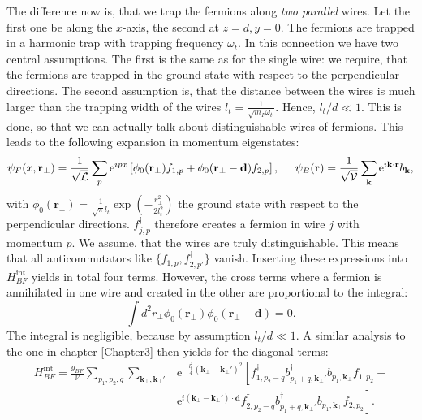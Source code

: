 The difference now is, that we trap the fermions along \textit{two parallel} wires. Let the first one be along the $x$-axis, the second at $z=d, y=0$. The fermions are trapped in a harmonic trap with trapping frequency $\omega_t$. In this connection we have two central assumptions. The first is the same as for the single wire: we require, that the fermions are trapped in the ground state with respect to the perpendicular directions. The second assumption is, that the distance between the wires is much larger than the trapping width of the wires $l_t = \frac{1}{\sqrt{m_F\omega_t}}$. Hence, $l_t/d \ll 1$. This is done, so that we can actually talk about distinguishable wires of fermions. This leads to the following expansion in momentum eigenstates:
\begin{equation}
\psi_F(x,\mathbf{r}_\perp) = \frac{1}{\sqrt{\mathcal{L}}}\sum_p \text{e}^{ipx} \left[\phi_0(\mathbf{r}_\perp) f_{1,p} + \phi_0(\mathbf{r}_\perp-\mathbf{d}) f_{2,p}\right], \hspace{0.5cm} \psi_B(\mathbf{r}) = \frac{1}{\sqrt{\mathcal{V}}}\sum_{\mathbf{k}} \text{e}^{i\mathbf{k}\cdot \mathbf{r}} b_\mathbf{k}, 
\end{equation}  
with $\phi_0(\mathbf{r}_\perp) = \frac{1}{\sqrt{\pi}l_t}\exp\left(-\frac{r_\perp^2}{2l_t^2}\right)$ the ground state with respect to the perpendicular directions. $f^\dagger_{j,p}$ therefore creates a fermion in wire $j$ with momentum $p$. We assume, that the wires are truly distinguishable. This means that all anticommutators like $\{f_{1,p}, f^\dagger_{2,p'}\}$ vanish. Inserting these expressions into $H_{BF}^\text{int}$ yields in total four terms. However, the cross terms where a fermion is annihilated in one wire and created in the other are proportional to the integral:
\begin{equation}
\int d^2 r_\perp \phi_0(\mathbf{r}_\perp)\phi_0(\mathbf{r}_\perp-\mathbf{d}) = 0. 
\end{equation}
The integral is negligible, because by assumption $l_t/d \ll 1$. A similar analysis to the one in chapter \ref{Chapter3} then yields for the diagonal terms:
\begin{align}
H_{BF}^\text{int} = \frac{g_{BF}}{\mathcal{V}}\sum_{p_1,p_2,q} \sum_{\mathbf{k}_\perp, \mathbf{k}_\perp'} & \text{e}^{-\frac{l_t^2}{4}(\mathbf{k}_\perp - \mathbf{k}_\perp')^2}\left[ f^\dagger_{1,p_2-q} b^\dagger_{p_1+q, \mathbf{k}_\perp'} b_{p_1,\mathbf{k}_\perp}f_{1,p_2} + \right. \nonumber \\
& \left. \text{e}^{i(\mathbf{k}_\perp - \mathbf{k}_\perp')\cdot \mathbf{d}}f_{2,p_2-q}^\dagger b_{p_1+q, \mathbf{k}_\perp'}^\dagger b_{p_1,\mathbf{k}_\perp}f_{2,p_2} \right].
\end{align}

